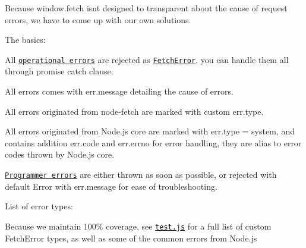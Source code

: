 Because {\ttfamily window.\+fetch} isn\textquotesingle{}t designed to transparent about the cause of request errors, we have to come up with our own solutions.

The basics\+:


\begin{DoxyItemize}
\item All \href{https://www.joyent.com/node-js/production/design/errors}{\tt operational errors} are rejected as \href{https://github.com/bitinn/node-fetch/blob/master/lib/fetch-error.js}{\tt Fetch\+Error}, you can handle them all through promise {\ttfamily catch} clause.
\item All errors comes with {\ttfamily err.\+message} detailing the cause of errors.
\item All errors originated from {\ttfamily node-\/fetch} are marked with custom {\ttfamily err.\+type}.
\item All errors originated from Node.\+js core are marked with {\ttfamily err.\+type = system}, and contains addition {\ttfamily err.\+code} and {\ttfamily err.\+errno} for error handling, they are alias to error codes thrown by Node.\+js core.
\item \href{https://www.joyent.com/node-js/production/design/errors}{\tt Programmer errors} are either thrown as soon as possible, or rejected with default {\ttfamily Error} with {\ttfamily err.\+message} for ease of troubleshooting.
\end{DoxyItemize}

List of error types\+:


\begin{DoxyItemize}
\item Because we maintain 100\% coverage, see \href{https://github.com/bitinn/node-fetch/blob/master/test/test.js}{\tt test.\+js} for a full list of custom {\ttfamily Fetch\+Error} types, as well as some of the common errors from Node.\+js 
\end{DoxyItemize}